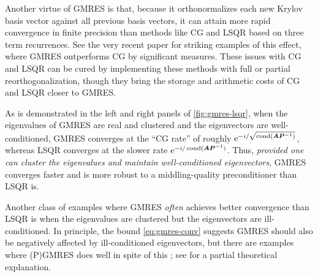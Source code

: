 \documentclass[onefignum,onetabnum,pagebackref,dvipsnames]{siamart220329}
\begin{document}
Another virtue of GMRES is that, because it orthonormalizes each new Krylov basis vector against all previous basis vectors, it can attain more rapid convergence in finite precision than methods like CG and LSQR based on three term recurrences.
See the very recent paper \cite[Fig.~2]{DNRY25} for striking examples of this effect, where GMRES outperforms CG by significant measures.
These issues with CG and LSQR can be cured by implementing these methods with full or partial reorthogonalization, though they bring the storage and arithmetic costs of CG and LSQR closer to GMRES.

As is demonstrated in the left and right panels of \cref{fig:gmres-lsqr}, when the eigenvalues of GMRES are real and clustered and the eigenvectors are well-conditioned, GMRES converges at the ``CG rate'' of roughly $\mathrm{e}^{-i/\sqrt{\operatorname{cond}(\boldsymbol{A}\boldsymbol{P}^{-1})}}$, whereas LSQR converges at the slower rate  $\mathrm{e}^{-i/\operatorname{cond}(\boldsymbol{A}\boldsymbol{P}^{-1})}$.
Thus, \emph{provided one can cluster the eigenvalues and maintain well-conditioned eigenvectors}, GMRES converges faster and is more robust to a middling-quality preconditioner than LSQR is.

Another class of examples where GMRES \emph{often} achieves better convergence than LSQR is when the eigenvalues are clustered but the eigenvectors are ill-conditioned.
In principle, the bound \cref{eq:gmres-conv} suggests GMRES should also be negatively affected by ill-conditioned eigenvectors, but there are examples where (P)GMRES does well in spite of this \cite[ex.~2]{Wat22}; see \cite[sec.~3]{NRT92} for a partial theoretical explanation.



\end{document}
